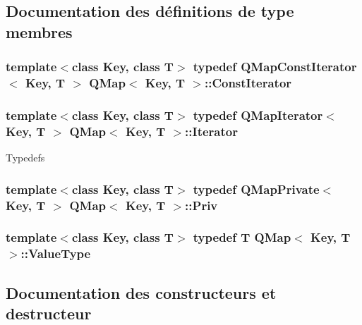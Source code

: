 \subsection{Documentation des définitions de type membres}
\hypertarget{class_q_map_afa9389e1d78c9571f1353fdbf0b267b4}{}
\subsubsection[{Const\+Iterator}]{\setlength{\rightskip}{0pt plus 5cm}template$<$class Key, class T$>$ typedef {\bf Q\+Map\+Const\+Iterator}$<$ Key, T $>$ {\bf Q\+Map}$<$ Key, T $>$\+::{\bf Const\+Iterator}}\label{class_q_map_afa9389e1d78c9571f1353fdbf0b267b4}
\hypertarget{class_q_map_aa920e1d34440b34269b350ab96bd73d0}{}
\subsubsection[{Iterator}]{\setlength{\rightskip}{0pt plus 5cm}template$<$class Key, class T$>$ typedef {\bf Q\+Map\+Iterator}$<$ Key, T $>$ {\bf Q\+Map}$<$ Key, T $>$\+::{\bf Iterator}}\label{class_q_map_aa920e1d34440b34269b350ab96bd73d0}
Typedefs \hypertarget{class_q_map_af63078f1afbbec29ac319ddbd88aefdd}{}
\subsubsection[{Priv}]{\setlength{\rightskip}{0pt plus 5cm}template$<$class Key, class T$>$ typedef {\bf Q\+Map\+Private}$<$ Key, T $>$ {\bf Q\+Map}$<$ Key, T $>$\+::{\bf Priv}}\label{class_q_map_af63078f1afbbec29ac319ddbd88aefdd}
\hypertarget{class_q_map_a207394e4bdb1d29a8a456991953cc42b}{}
\subsubsection[{Value\+Type}]{\setlength{\rightskip}{0pt plus 5cm}template$<$class Key, class T$>$ typedef T {\bf Q\+Map}$<$ Key, T $>$\+::{\bf Value\+Type}}\label{class_q_map_a207394e4bdb1d29a8a456991953cc42b}


\subsection{Documentation des constructeurs et destructeur}
\hypertarget{class_q_map_a72c9b87bd2e154fc1a0afc0bd6cc4223}{}
